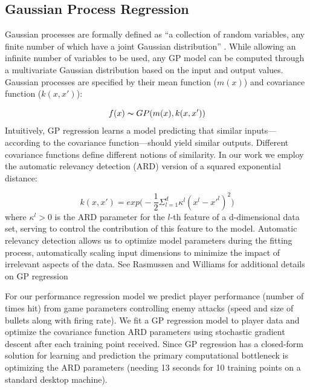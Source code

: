 \documentclass[letterpaper]{article}
\begin{document}
\subsection{Gaussian Process Regression}

Gaussian processes are formally defined as ``a collection of random variables, any finite number of which have a joint Gaussian distribution'' \cite{rasmussen2006}. While allowing an infinite number of variables to be used, any GP model can be computed through a multivariate Gaussian distribution based on the input and output values. Gaussian processes are specified by their mean function ($m(x)$) and covariance function ($k(x,x')$):

$$ f(x) \thicksim GP( m(x), k(x,x') ) $$
Intuitively, GP regression learns a model predicting that similar inputs---according to the covariance function---should yield similar outputs. Different covariance functions define different notions of similarity. In our work we employ the automatic relevancy detection (ARD) version of a squared exponential distance:

$$ k(x,x') = exp\big( -\frac{1}{2} \Sigma_{l=1}^{d} \kappa^{l} (x^{l} - x'^{l})^2 \big) $$
where $\kappa^{l} > 0$ is the ARD parameter for the $l$-th feature of a {d}-dimensional data set, serving to control the contribution of this feature to the model. Automatic relevancy detection allows us to optimize model parameters during the fitting process, automatically scaling input dimensions to minimize the impact of irrelevant aspects of the data. 
See Rasmussen and Williams  for additional details on GP regression

For our performance regression model we predict player performance (number of times hit) from game parameters controlling enemy attacks (speed and size of bullets along with firing rate). We fit a GP regression model to player data and optimize the covariance function ARD parameters using stochastic gradient descent after each training point received. Since GP regression has a closed-form solution for learning and prediction the primary computational bottleneck is optimizing the ARD parameters (needing 13 seconds for 10 training points on a standard desktop machine).
\end{document}
